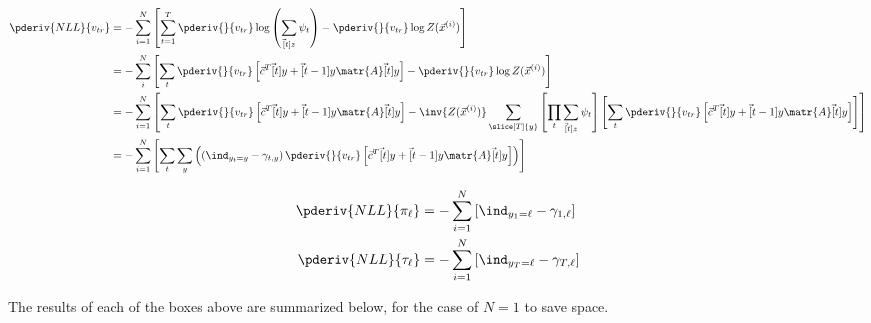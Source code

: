 \documentclass[11pt]{article}
\begin{document}
\begin{example}
	\begin{align}
	\pderiv{NLL}{v_{tr}} 
	&=  - \sum_{i=1}^{N} \left[ \sum_{t = 1}^{T} \pderiv{}{v_{tr}} \log\left( \sum_{\vec[t]{z}} \psi_t \right) 
	- \pderiv{}{v_{tr}} \log Z(\vec{x}^{(i)}) \right] \\
	&= -\sum_i^N \left[ 
	\sum_t \pderiv{}{v_{tr}} \left[ \vec{c}^T \vec[t]{y} + \vec[t-1]{y}\matr{A}\vec[t]{y} \right]
	- \pderiv{}{v_{tr}} \log Z(\vec{x}^{(i)}) 
	\right]\\
	&= - \sum_{i=1}^{N} \left[ \sum_t  \pderiv{}{v_{tr}} \left[ \vec{c}^T \vec[t]{y} + \vec[t-1]{y}\matr{A}\vec[t]{y} \right]
	- \inv{Z(\vec{x}^{(i)})} \sum_{\slice[T]{y}}   
	\left[ \prod_t \sum_{\vec[t]{z}} \psi_t \right] \left[
	\sum_t  \pderiv{}{v_{tr}} \left[  \vec{c}^T \vec[t]{y} + \vec[t-1]{y}\matr{A}\vec[t]{y} \right]
	\right]
	\right] \\
	&= - \sum_{i=1}^{N} \left[ \sum_t \sum_y \left(    \left(
	\ind_{y_t = y} -  \gamma_{t,y} \right) 
	\pderiv{}{v_{tr}} \left[  \vec{c}^T \vec[t]{y} + \vec[t-1]{y}\matr{A}\vec[t]{y} \right] 
	\right)\right] 
	\end{align}
\end{example}



\begin{example}
	\begin{align}
	\pderiv{NLL}{\pi_\ell} 
	&=  - \sum_{i=1}^{N} \left[ \ind_{y_1 = \ell} - \gamma_{1, \ell} \right] \\
	\pderiv{NLL}{\tau_\ell} 
	&=  - \sum_{i=1}^{N} \left[ \ind_{y_T = \ell} - \gamma_{T, \ell} \right]
	\end{align}
\end{example}


The results of each of the boxes above are summarized below, for the case of $N=1$ to save space.
\end{document}
